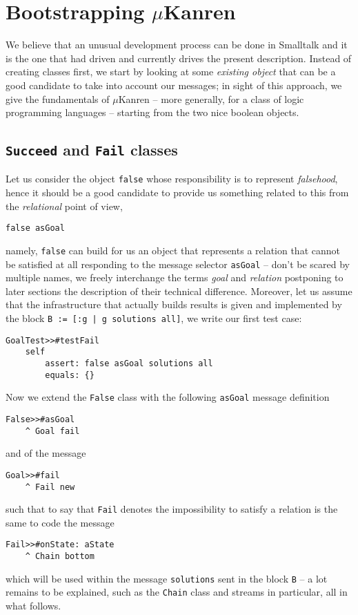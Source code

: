 \documentclass[a4paper,11pt]{article}
\begin{document}
\section{Bootstrapping $\mu$Kanren}

We believe that an unusual development process can be done in Smalltalk and it
is the one that had driven and currently drives the present description.
Instead of creating classes first, we start by looking at some \textit{existing
object} that can be a good candidate to take into account our messages; in
sight of this approach, we give the fundamentals of $\mu$Kanren -- more
generally, for a class of logic programming languages -- starting from the two
nice boolean objects.

\subsection{\texttt{Succeed} and \texttt{Fail} classes}

Let us consider the object \Verb|false| whose responsibility is to represent
\textit{falsehood}, hence it should be a good candidate to provide us something
related to this from the \textit{relational} point of view,
\begin{verbatim}
false asGoal
\end{verbatim}
namely, \Verb|false| can build for us an object that represents a relation that
cannot be satisfied at all responding to the message selector \Verb|asGoal| --
don't be scared by multiple names, we freely interchange the terms
\textit{goal} and \textit{relation} postponing to later sections the
description of their technical difference. Moreover, let us
assume that the infrastructure that actually builds results is given and implemented
by the block \texttt{B := [:g | g solutions all]}, we write our first test case:
\begin{verbatim}
GoalTest>>#testFail
    self
        assert: false asGoal solutions all
        equals: {}
\end{verbatim}
Now we extend the \Verb|False| class with the following \Verb|asGoal| message
definition
\begin{verbatim}
False>>#asGoal
    ^ Goal fail
\end{verbatim}
and of the message
\begin{verbatim}
Goal>>#fail
    ^ Fail new
\end{verbatim}
such that to say that \verb|Fail| denotes the impossibility to satisfy a relation
is the same to code the message
\begin{verbatim}
Fail>>#onState: aState
    ^ Chain bottom
\end{verbatim}
which will be used within the message \Verb|solutions| sent in the block
\Verb|B| -- a lot remains to be explained, such as the \Verb|Chain| class and
streams in particular, all in what follows.
\end{document}
